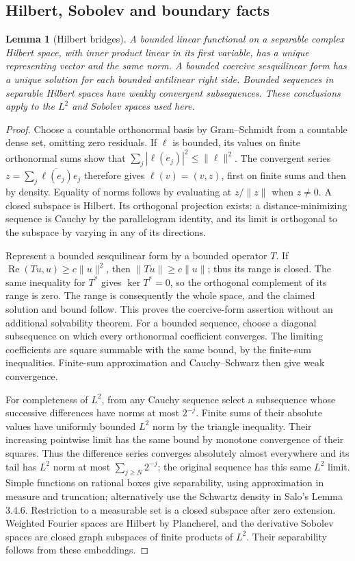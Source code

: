 \documentclass[11pt]{article}
\newtheorem{lemma}[theorem]{Lemma}
\theoremstyle{remark}
\numberwithin{equation}{section}
\begin{document}
\subsection{Hilbert, Sobolev and boundary facts}

\begin{lemma}[Hilbert bridges]\label{lem:hilbert-background}
A bounded linear functional on a separable complex Hilbert space, with inner
product linear in its first variable, has a unique representing vector and
the same norm. A bounded coercive sesquilinear form has a unique solution for
each bounded antilinear right side. Bounded sequences in separable Hilbert
spaces have weakly convergent subsequences. These conclusions apply to the
$L^2$ and Sobolev spaces used here.
\end{lemma}
\begin{proof}
Choose a countable orthonormal basis by Gram--Schmidt from a countable dense
set, omitting zero residuals. If $\ell$ is bounded, its values on finite
orthonormal sums show that $\sum_j|\ell(e_j)|^2\le\|\ell\|^2$.
The convergent series $z=\sum_j\overline{\ell(e_j)}e_j$ therefore gives
$\ell(v)=(v,z)$, first on finite sums and then by density. Equality of
norms follows by evaluating at $z/\|z\|$ when $z\ne0$. A closed subspace
is Hilbert. Its orthogonal projection exists: a distance-minimizing
sequence is Cauchy by the parallelogram identity, and its limit is
orthogonal to the subspace by varying in any of its directions.

Represent a bounded sesquilinear form by a bounded operator $T$. If
$\operatorname{Re}(Tu,u)\ge c\|u\|^2$, then $\|Tu\|\ge c\|u\|$;
thus its range is closed. The same inequality for $T^*$ gives
$\ker T^*=0$, so the orthogonal complement of its range is zero.
The range is consequently the whole space, and the claimed solution and
bound follow. This proves the coercive-form assertion without an additional
solvability theorem. For a bounded sequence, choose a diagonal subsequence
on which every orthonormal coefficient converges. The limiting coefficients
are square summable with the same bound, by the finite-sum inequalities.
Finite-sum approximation and Cauchy--Schwarz then give weak convergence.

For completeness of $L^2$, from any Cauchy sequence select a subsequence
whose successive differences have norms at most $2^{-j}$. Finite sums of
their absolute values have uniformly bounded $L^2$ norm by the triangle
inequality. Their increasing pointwise limit has the same bound by monotone
convergence of their squares. Thus the difference series
converges absolutely almost everywhere and its tail has $L^2$ norm at most
$\sum_{j\ge N}2^{-j}$; the original sequence has this same $L^2$ limit.
Simple functions on rational boxes give separability, using approximation
in measure and truncation; alternatively use the Schwartz density in
Salo's Lemma 3.4.6. Restriction to a measurable set is a closed subspace
after zero extension. Weighted Fourier spaces are Hilbert by Plancherel,
and the derivative Sobolev spaces are closed graph subspaces of finite
products of $L^2$. Their separability follows from these embeddings.
\end{proof}
\end{document}
